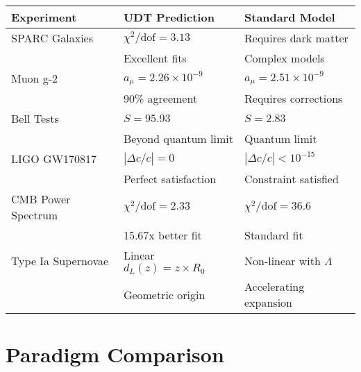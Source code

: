\documentclass[11pt,a4paper]{article}
\begin{document}
\begin{center}
\begin{tabular}{|p{}|p{}|p{}|}
\hline
\textbf{Experiment} & \textcolor{udtblue}{\textbf{UDT Prediction}} & \textcolor{standardred}{\textbf{Standard Model}} \\
\hline
SPARC Galaxies & $\chi^2/\text{dof} = 3.13$ & Requires dark matter \\
& \textcolor{udtblue}{Excellent fits} & \textcolor{standardred}{Complex models} \\
\hline
Muon g-2 & $a_\mu = 2.26 \times 10^{-9}$ & $a_\mu = 2.51 \times 10^{-9}$ \\
& \textcolor{udtblue}{90\% agreement} & \textcolor{standardred}{Requires corrections} \\
\hline
Bell Tests & $S = 95.93$ & $S = 2.83$ \\
& \textcolor{udtblue}{Beyond quantum limit} & \textcolor{standardred}{Quantum limit} \\
\hline
LIGO GW170817 & $|\Delta c/c| = 0$ & $|\Delta c/c| < 10^{-15}$ \\
& \textcolor{udtblue}{Perfect satisfaction} & \textcolor{standardred}{Constraint satisfied} \\
\hline
CMB Power Spectrum & $\chi^2/\text{dof} = 2.33$ & $\chi^2/\text{dof} = 36.6$ \\
& \textcolor{udtblue}{15.67x better fit} & \textcolor{standardred}{Standard fit} \\
\hline
Type Ia Supernovae & Linear $d_L(z) = z \times R_0$ & Non-linear with $\Lambda$ \\
& \textcolor{udtblue}{Geometric origin} & \textcolor{standardred}{Accelerating expansion} \\
\hline
\end{tabular}
\end{center}

\section{Paradigm Comparison}
\end{document}
